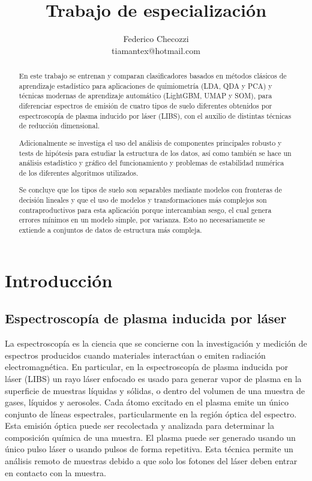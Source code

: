 \documentclass[12pt]{article}
\title{Trabajo de especialización}
\author{
    Federico Checozzi \\
    \textrm{tiamantex@hotmail.com} 
    }
\date{}
\begin{document}
\maketitle

\begin{abstract}
En este trabajo se entrenan y comparan clasificadores basados en métodos clásicos de aprendizaje estadístico para aplicaciones de quimiometría (LDA, QDA y PCA) y técnicas modernas de aprendizaje automático (LightGBM, UMAP y SOM), para diferenciar espectros de emisión de cuatro tipos de suelo diferentes obtenidos por espectroscopía de plasma inducido por láser (LIBS), con el auxilio de distintas técnicas de reducción dimensional.

Adicionalmente se investiga el uso del análisis de componentes principales robusto y tests de hipótesis para estudiar la estructura de los datos, así como también se hace un análisis estadístico y gráfico del funcionamiento y problemas de estabilidad numérica de los diferentes algoritmos utilizados.

Se concluye que los tipos de suelo son separables mediante modelos con fronteras de decisión lineales y que el uso de modelos y transformaciones más complejos son contraproductivos para esta aplicación porque intercambian sesgo, el cual genera errores mínimos en un modelo simple, por varianza. Esto no necesariamente se extiende a conjuntos de datos de estructura más compleja.
\end{abstract}

\tableofcontents
\newpage
\section{Introducción}
\subsection{Espectroscopía de plasma inducida por láser}

La espectroscopía es la ciencia que se concierne con la investigación y medición de espectros producidos cuando materiales interactúan o emiten radiación electromagnética\cite{Spectroscopy}. En particular, en la espectroscopía de plasma inducida por láser (LIBS) un rayo láser enfocado es usado para generar vapor de plasma en la superficie de muestras líquidas y sólidas, o dentro del volumen de una muestra de gases, líquidos y aerosoles. Cada átomo excitado en el plasma emite un único conjunto de líneas espectrales, particularmente en la región óptica del espectro. Esta emisión óptica puede ser recolectada y analizada para determinar la composición química de una muestra. El plasma puede ser generado usando un único pulso láser o usando pulsos de forma repetitiva. Esta técnica permite un análisis remoto de muestras debido a que solo los fotones del láser deben entrar en contacto con la muestra.
\end{document}
